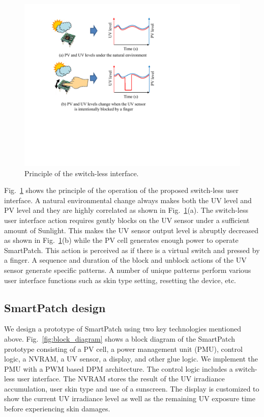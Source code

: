 \documentclass[journal]{IEEEtran}
\begin{document}
\begin{figure}
\centering
\includegraphics[width=0.8\hsize]{Figures/switchless_interface.pdf}
\caption{Principle of the switch-less interface.}
\label{fig:switchless_interface}
\end{figure}

Fig.~\ref{fig:switchless_interface} shows the principle of the operation of the proposed switch-less user interface. A natural environmental change always makes both the UV level and PV level and they are highly correlated as shown in Fig.~\ref{fig:switchless_interface}(a). The switch-less user interface action requires gently blocks on the UV sensor under a sufficient amount of Sunlight. This makes the UV sensor output level is abruptly decreased as shown in Fig.~\ref{fig:switchless_interface}(b) while the PV cell generates enough power to operate SmartPatch. This action is perceived as if there is a virtual switch and pressed by a finger. A sequence and duration of the block and unblock actions of the UV sensor generate specific patterns. A number of unique patterns perform various user interface functions such as skin type setting, resetting the device, etc.

\subsection{SmartPatch design}

We design a prototype of SmartPatch using two key technologies mentioned above.
Fig.~\ref{fig:block_diagram} shows a block diagram of the SmartPatch prototype consisting of a PV cell, a power management unit (PMU), control logic, a NVRAM, a UV sensor, a display, and other glue logic. We implement the PMU with a PWM based DPM architecture. The control logic includes a switch-less user interface. The NVRAM stores the result of the UV irradiance accumulation, user skin type and use of a sunscreen. The display is customized to show the current UV irradiance level as well as the remaining UV exposure time before experiencing skin damages.
\end{document}
